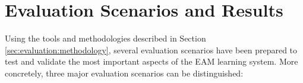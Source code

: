 \section{Evaluation Scenarios and Results}
\label{sec:evaluation:scenarios}



Using the tools and methodologies described in Section \ref{sec:evaluation:methodology}, several evaluation scenarios have been prepared to test and validate the most important aspects of the EAM learning system. More concretely, three major evaluation scenarios can be distinguished:

